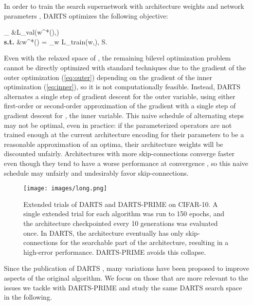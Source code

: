 \documentclass[letterpaper]{article} \usepackage{aaai22}  \usepackage{times}  \usepackage{helvet}  \usepackage{courier}  \usepackage[hyphens]{url}  \usepackage{graphicx} \urlstyle{rm} \def\UrlFont{\rm}  \usepackage{natbib}  \usepackage{caption} \DeclareCaptionStyle{ruled}{labelfont=normalfont,labelsep=colon,strut=off} \frenchspacing  \setlength{\pdfpagewidth}{8.5in}  \setlength{\pdfpageheight}{11in}  \usepackage{algorithm}
\DeclareMathOperator*{\argmin}{argmin}
\begin{document}
In order to train the search supernetwork with architecture weights  and network parameters , DARTS optimizes the following objective:

 \min_\alpha \text{ } &L_{val}(w^*(\alpha),\alpha)    \label{eq:outer} \\
  \textbf{s.t. } &w^*(\alpha) = \argmin_w L_{train}(w,\alpha), \text{ }\alpha \in S. \label{eq:inner}
 
Even with the relaxed space of , the remaining bilevel optimization problem cannot be directly optimized with standard techniques due to the gradient of the outer optimization (\ref{eq:outer}) depending on the gradient of the inner optimization (\ref{eq:inner}), so it is not computationally feasible. Instead, DARTS alternates a single step of gradient descent for  the outer variable, using either first-order or second-order approximation of the gradient with a single step of gradient descent for , the inner variable. This naive schedule of alternating steps may not be optimal, even in practice: if the parameterized operators are not trained enough at the current architecture encoding for their parameters to be a reasonable approximation of an optima, their architecture weights will be discounted unfairly. Architectures with more skip-connections converge faster even though they tend to have a worse performance at convergence \cite{zhou2020theory}, so this naive schedule may unfairly and undesirably favor skip-connections.  



\begin{figure}[tb!]
\texttt{[image: images/long.png]}
\caption{Extended trials of DARTS and DARTS-PRIME on CIFAR-10. A single extended trial for each algorithm was run to 150 epochs, and the architecture checkpointed every 10 generations was evaluated once. In DARTS, the architecture eventually has only skip-connections for the searchable part of the architecture, resulting in a high-error performance. DARTS-PRIME avoids this collapse.} \label{fig:long}
\end{figure}

Since the publication of DARTS \cite{liu2018darts}, many variations have been proposed to improve aspects of the original algorithm. We focus on those that are more relevant to the issues we tackle with DARTS-PRIME and study the same DARTS search space in the following.
\end{document}
